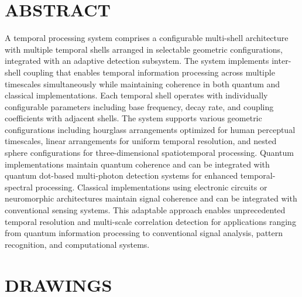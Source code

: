 \documentclass[12pt,letterpaper]{article}
\begin{document}
\newpage
\section*{ABSTRACT}

A temporal processing system comprises a configurable multi-shell architecture with multiple temporal shells arranged in selectable geometric configurations, integrated with an adaptive detection subsystem. The system implements inter-shell coupling that enables temporal information processing across multiple timescales simultaneously while maintaining coherence in both quantum and classical implementations. Each temporal shell operates with individually configurable parameters including base frequency, decay rate, and coupling coefficients with adjacent shells. The system supports various geometric configurations including hourglass arrangements optimized for human perceptual timescales, linear arrangements for uniform temporal resolution, and nested sphere configurations for three-dimensional spatiotemporal processing. Quantum implementations maintain quantum coherence and can be integrated with quantum dot-based multi-photon detection systems for enhanced temporal-spectral processing. Classical implementations using electronic circuits or neuromorphic architectures maintain signal coherence and can be integrated with conventional sensing systems. This adaptable approach enables unprecedented temporal resolution and multi-scale correlation detection for applications ranging from quantum information processing to conventional signal analysis, pattern recognition, and computational systems.

\newpage
\section*{DRAWINGS}
\end{document}
